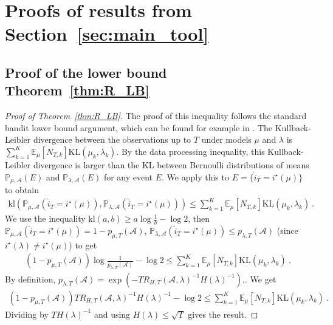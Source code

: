 \documentclass{article}
\newcommand{\KL}{\mathrm{KL}}
\newcommand{\kl}{\mathrm{kl}}
\begin{document}
\section{Proofs of results from Section~\ref{sec:main_tool}}
\label{sec:proofs_relative_to_section_sec:main_tool}

\subsection{Proof of the lower bound Theorem~\ref{thm:R_LB}}
\label{sub:main_theorem}

\begin{proof}[Proof of Theorem~\ref{thm:R_LB}]
The proof of this inequality follows the standard bandit lower bound argument, which can be found for example in \cite{garivier2019explore}.
The Kullback-Leibler divergence between the observations up to $T$ under models $\mu$ and $\lambda$ is $\sum_{k=1}^K \mathbb{E}_\mu[N_{T,k}] \KL(\mu_k, \lambda_k)$.
By the data processing inequality, this Kullback-Leibler divergence is larger than the KL between Bernoulli distributions of means $\mathbb{P}_{\mu, \mathcal A}(E)$ and $\mathbb{P}_{\lambda, \mathcal A}(E)$ for any event $E$. We apply this to $E = \{\hat{i}_T = i^\star(\mu)\}$ to obtain
\begin{align*}
\kl(\mathbb{P}_{\mu, \mathcal A}(\hat{i}_T = i^\star(\mu)), \mathbb{P}_{\lambda, \mathcal A}(\hat{i}_T = i^\star(\mu)))
\le \sum_{k=1}^K \mathbb{E}_\mu[N_{T,k}] \KL(\mu_k, \lambda_k)
\: .
\end{align*}
We use the inequality $\kl(a, b) \ge a \log \frac{1}{b} - \log 2$, then $\mathbb{P}_{\mu, \mathcal A}(\hat{i}_T = i^\star(\mu)) = 1 - p_{\mu, T}(\mathcal A)$, $\mathbb{P}_{\lambda, \mathcal A}(\hat{i}_T = i^\star(\mu)) \le p_{\lambda, T}(\mathcal A)$ (since $i^\star(\lambda) \ne i^\star(\mu)$) to get
\begin{align*}
(1 - p_{\mu, T}(\mathcal A)) \log \frac{1}{p_{\lambda, T}(\mathcal A)} - \log 2
\le \sum_{k=1}^K \mathbb{E}_\mu[N_{T,k}] \KL(\mu_k, \lambda_k)
\: .
\end{align*}
By definition, $p_{\lambda, T}(\mathcal A) = \exp(-T R_{H,T}(\mathcal A, \lambda)^{-1} H(\lambda)^{-1})$,. We get
\begin{align*}
(1 - p_{\mu, T}(\mathcal A)) T R_{H,T}(\mathcal A, \lambda)^{-1} H(\lambda)^{-1} - \log 2
\le \sum_{k=1}^K \mathbb{E}_\mu[N_{T,k}] \KL(\mu_k, \lambda_k)
\: .
\end{align*}
Dividing by $T H(\lambda)^{-1}$ and using $H(\lambda) \le \sqrt{T}$ gives the result.
\end{proof}
\end{document}
